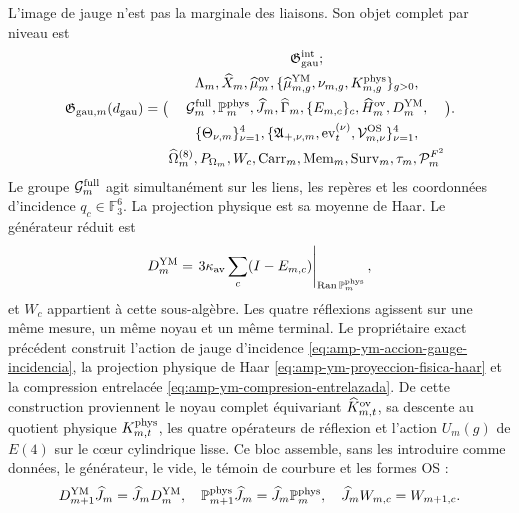 L'image de jauge n'est pas la marginale des liaisons. Son objet complet par niveau est
\begin{equation}\label{eq:pdf2-g-gau-explicito}
 \mathfrak G_{{\rm gau},m}(d_{\rm gau})=
 \bigl(
 \begin{gathered}
  \mathfrak G_{\rm gau}^{\rm int};\\
  \Lambda_m,\widehat X_m,\widehat\mu_m^{\rm ov},
  \{\widehat\mu_{m,g}^{\rm YM},\nu_{m,g},K_{m,g}^{\rm phys}\}_{g>0},\\
  \mathcal G_m^{\rm full},\mathbb P_m^{\rm phys},
  \widehat J_m,\widehat\Gamma_m,
  \{E_{m,c}\}_c,\widehat H_m^{\rm ov},D_m^{\rm YM},\\
  \{\Theta_{\nu,m}\}_{\nu=1}^4,
  \{\mathfrak A_{+,\nu,m},\operatorname{ev}_{t}^{(\nu)},
      \mathcal V_{m,\nu}^{\rm OS}\}_{\nu=1}^4,\\
  \widehat\Omega_m^{(8)},P_{\Omega_m},W_c,
  \operatorname{Carr}_m,\operatorname{Mem}_m,
  \operatorname{Surv}_m,\tau_m,\mathcal P_m^{F^2}
 \end{gathered}
 \bigr).
\end{equation}
Le groupe $\mathcal G_m^{\rm full}$ agit simultanément sur les liens, les repères et les
coordonnées d’incidence $q_c\in\mathbb F_3^6$. La projection physique est sa moyenne
de Haar. Le générateur réduit est
\begin{equation}\label{eq:pdf2-g-gau-generador-estructural}
 D_m^{\rm YM}
 =\left.3\kappa_{\rm av}\sum_c(I-E_{m,c})
  \right|_{\operatorname{Ran}\mathbb P_m^{\rm phys}},
\end{equation}
et $W_c$ appartient à cette sous-algèbre. Les quatre réflexions agissent sur une même mesure, un même noyau et un même terminal.
Le propriétaire exact précédent construit l'action de jauge d'incidence \eqref{eq:amp-ym-accion-gauge-incidencia}, la projection physique de Haar \eqref{eq:amp-ym-proyeccion-fisica-haar} et la compression entrelacée \eqref{eq:amp-ym-compresion-entrelazada}. De cette construction proviennent le noyau complet équivariant $\widehat K_{m,t}^{\rm ov}$, sa descente au quotient physique $K_{m,t}^{\rm phys}$, les quatre opérateurs de réflexion et l'action $U_m(g)$ de $E(4)$ sur le cœur cylindrique lisse. Ce bloc assemble, sans les introduire comme données, le générateur, le vide, le témoin de courbure et les formes OS :
\begin{equation}\label{eq:pdf2-g-gau-entrelazamiento-dato}
 D_{m+1}^{\rm YM}\widehat J_m=\widehat J_mD_m^{\rm YM},
 \quad
 \mathbb P_{m+1}^{\rm phys}\widehat J_m
  =\widehat J_m\mathbb P_m^{\rm phys},
 \quad
 \widehat J_mW_{m,c}=W_{m+1,c}.
\end{equation}
